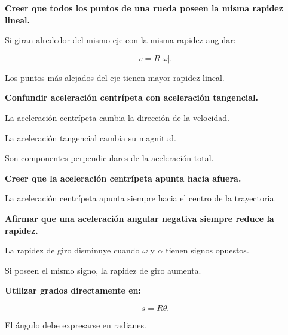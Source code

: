 \begin{errorfrecuente}

\textbf{Creer que todos los puntos de una rueda poseen la misma rapidez lineal.}

Si giran alrededor del mismo eje con la misma rapidez angular:

\[
v=R|\omega|.
\]

Los puntos más alejados del eje tienen mayor rapidez lineal.

\end{errorfrecuente}


\begin{errorfrecuente}

\textbf{Confundir aceleración centrípeta con aceleración tangencial.}

La aceleración centrípeta cambia la dirección de la velocidad.

La aceleración tangencial cambia su magnitud.

Son componentes perpendiculares de la aceleración total.

\end{errorfrecuente}


\begin{errorfrecuente}

\textbf{Creer que la aceleración centrípeta apunta hacia afuera.}

La aceleración centrípeta apunta siempre hacia el centro de la trayectoria.

\end{errorfrecuente}


\begin{errorfrecuente}

\textbf{Afirmar que una aceleración angular negativa siempre reduce la rapidez.}

La rapidez de giro disminuye cuando \(\omega\) y \(\alpha\) tienen signos
opuestos.

Si poseen el mismo signo, la rapidez de giro aumenta.

\end{errorfrecuente}


\begin{errorfrecuente}

\textbf{Utilizar grados directamente en:}

\[
s=R\theta.
\]

El ángulo debe expresarse en radianes.

\end{errorfrecuente}


